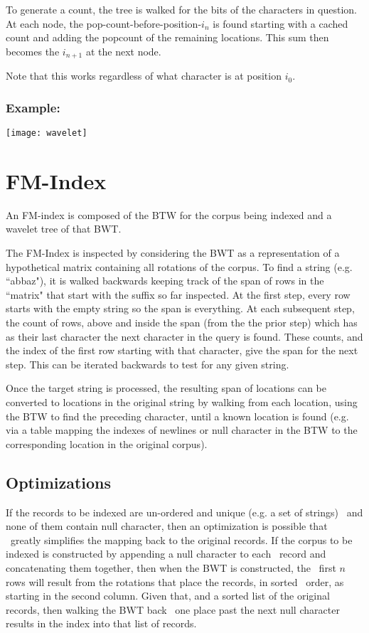 \documentclass[12pt]{article}
\begin{document}
To generate a count, the tree is walked for the bits of the characters in question.
At each node, the pop-count-before-position-$i_n$ is found starting with a cached
 count and adding the popcount of the remaining locations.
This sum then becomes the $i_{n+1}$ at the next node.

Note that this works regardless of what character is at position $i_0$.

\subsubsection{Example:}
\texttt{[image: wavelet]}

\section{FM-Index}

An FM-index is composed of the BTW for the corpus being indexed and a wavelet
 tree of that BWT.

The FM-Index is inspected by considering the BWT as a representation of a
 hypothetical matrix containing all rotations of the corpus.
To find a string (e.g. ``abbaz"), it is walked backwards keeping track of the
 span of rows in the ``matrix" that start with the suffix so far inspected.
At the first step, every row starts with the empty string so the span is everything.
At each subsequent step, the count of rows, above and inside the span (from the
 the prior step) which has as their last character the next character in the
 query is found.
These counts, and the index of the first row starting with that character, give
 the span for the next step.
This can be iterated backwards to test for any given string.

Once the target string is processed, the resulting span of locations can be
 converted to locations in the original string by walking from each location,
 using the BTW to find the preceding character, until a known location is found
 (e.g. via a table mapping the indexes of newlines or null character in the BTW
 to the corresponding location in the original corpus).

\subsection{Optimizations}

If the records to be indexed are un-ordered and unique (e.g. a set of strings)
 and none of them contain null character, then an optimization is possible that
 greatly simplifies the mapping back to the original records.
If the corpus to be indexed is constructed by appending a null character to each
 record and concatenating them together, then when the BWT is constructed, the
 first $n$ rows will result from the rotations that place the records, in sorted
 order, as starting in the second column.
Given that, and a sorted list of the original records, then walking the BWT back
 one place past the next null character results in the index into that list of
 records.
\end{document}

